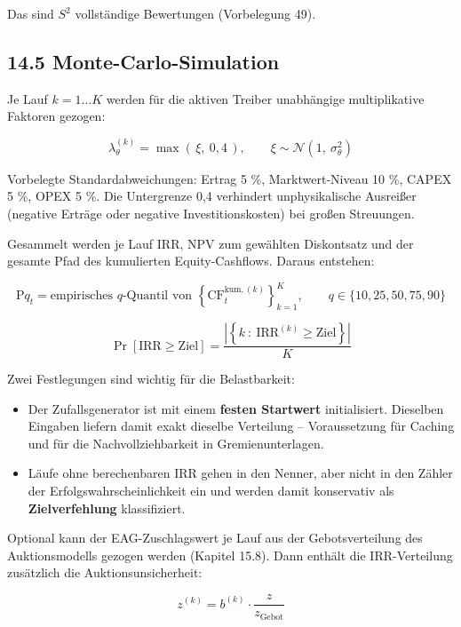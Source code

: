 \documentclass[
  a4paper,
  10pt]{article}
\providecommand{\tightlist}{%
  \setlength{\itemsep}{0pt}\setlength{\parskip}{0pt}}
\begin{document}
Das sind \(S^2\) vollständige Bewertungen (Vorbelegung 49).

\hypertarget{monte-carlo-simulation}{%
\subsection{14.5 Monte-Carlo-Simulation}\label{monte-carlo-simulation}}

Je Lauf \(k = 1 \dots K\) werden für die aktiven Treiber unabhängige
multiplikative Faktoren gezogen:

\[ \lambda^{(k)}_\theta = \max\left(\,\xi,\ 0{,}4\,\right), \qquad \xi \sim \mathcal{N}\left(1,\ \sigma_\theta^2\right) \]

Vorbelegte Standardabweichungen: Ertrag 5 \%, Marktwert-Niveau 10 \%,
CAPEX 5 \%, OPEX 5 \%. Die Untergrenze 0,4 verhindert unphysikalische
Ausreißer (negative Erträge oder negative Investitionskosten) bei großen
Streuungen.

Gesammelt werden je Lauf IRR, NPV zum gewählten Diskontsatz und der
gesamte Pfad des kumulierten Equity-Cashflows. Daraus entstehen:

\[ \mathrm{P}q_t = \text{empirisches } q\text{-Quantil von } \left\{\mathrm{CF}^{\mathrm{kum},(k)}_t\right\}_{k=1}^{K}, \qquad q \in \{10, 25, 50, 75, 90\} \]

\[ \Pr\left[\mathrm{IRR} \geq \mathrm{Ziel}\right] = \frac{\left|\left\{k \ :\ \mathrm{IRR}^{(k)} \geq \mathrm{Ziel}\right\}\right|}{K} \]

Zwei Festlegungen sind wichtig für die Belastbarkeit:

\begin{itemize}
\tightlist
\item
  Der Zufallsgenerator ist mit einem \textbf{festen Startwert}
  initialisiert. Dieselben Eingaben liefern damit exakt dieselbe
  Verteilung -- Voraussetzung für Caching und für die
  Nachvollziehbarkeit in Gremienunterlagen.
\item
  Läufe ohne berechenbaren IRR gehen in den Nenner, aber nicht in den
  Zähler der Erfolgswahrscheinlichkeit ein und werden damit konservativ
  als \textbf{Zielverfehlung} klassifiziert.
\end{itemize}

Optional kann der EAG-Zuschlagswert je Lauf aus der Gebotsverteilung des
Auktionsmodells gezogen werden (Kapitel 15.8). Dann enthält die
IRR-Verteilung zusätzlich die Auktionsunsicherheit:

\[ z^{(k)} = b^{(k)} \cdot \frac{z}{z_{\mathrm{Gebot}}} \]
\end{document}
